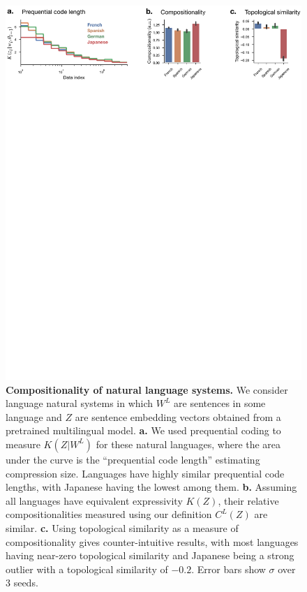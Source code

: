 \documentclass{article} %
\begin{document}
\begin{figure}[ht]
    \centering
    \includegraphics[width=\linewidth]{figures/natural.pdf}
    \caption{\textbf{Compositionality of natural language systems.} We consider language natural systems in which $W^L$ are sentences in some language and $Z$ are sentence embedding vectors obtained from a pretrained multilingual model. \textbf{a.} We used prequential coding to measure $K(Z | W^L)$ for these natural languages, where the area under the curve is the ``prequential code length'' estimating compression size. Languages have highly similar prequential code lengths, with Japanese having the lowest among them. \textbf{b.} Assuming all languages have equivalent expressivity $K(Z)$, their relative compositionalities measured using our definition $C^L(Z)$ are similar. \textbf{c.} Using topological similarity as a measure of compositionality gives counter-intuitive results, with most languages having near-zero topological similarity and Japanese being a strong outlier with a topological similarity of $-0.2$. Error bars show $\sigma$ over $3$ seeds.}
    \label{fig:natural}
\end{figure}
\end{document}
